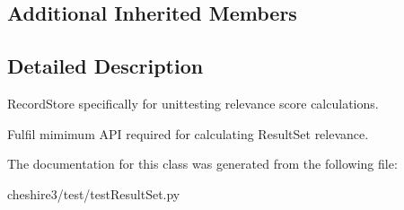 \subsection*{Additional Inherited Members}


\subsection{Detailed Description}
\begin{DoxyVerb}RecordStore specifically for unittesting relevance score calculations.

Fulfil mimimum API required for calculating ResultSet relevance.
\end{DoxyVerb}
 

The documentation for this class was generated from the following file\-:\begin{DoxyCompactItemize}
\item 
cheshire3/test/test\-Result\-Set.\-py\end{DoxyCompactItemize}
